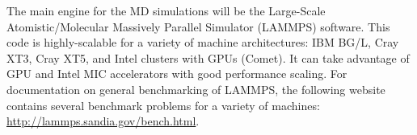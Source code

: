 The main engine for the MD simulations will be the Large-Scale Atomistic/Molecular Massively Parallel Simulator (LAMMPS) software. This code is highly-scalable for a variety of machine architectures: IBM BG/L, Cray XT3, Cray XT5, and Intel clusters with GPUs (Comet). It can take advantage of GPU and Intel MIC accelerators with good performance scaling. For documentation on general benchmarking of LAMMPS, the following website contains several benchmark problems for a variety of machines: \href{http://lammps.sandia.gov/bench.html}{http://lammps.sandia.gov/bench.html}. 
